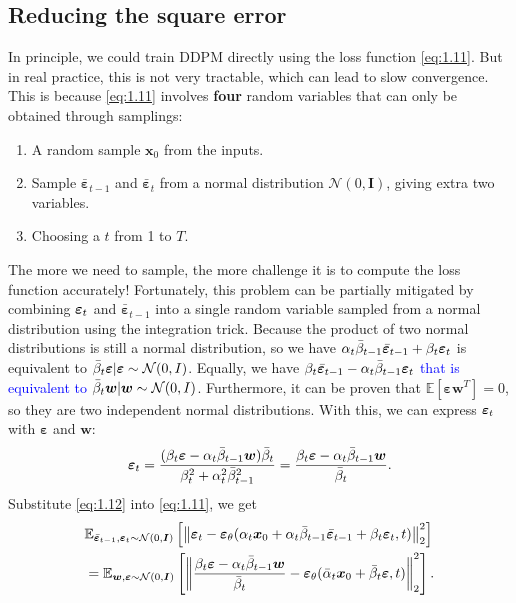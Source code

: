 \subsection{Reducing the square error}\label{sect1:reduce_error}
In principle, we could train DDPM directly using the loss function \cref{eq:1.11}. But in real practice, this is not very tractable, which can lead to slow convergence. This is because \cref{eq:1.11} involves \textbf{four} random variables that can only be obtained through samplings:
\begin{myquote}
\begin{enumerate}
    \item A random sample $\bm{x}_0$ from the inputs.
    \item Sample $\bar{\bm{\varepsilon}}_{t-1}$ and $\bar{\bm{\varepsilon}}_{t}$ from a normal distribution $\mathcal{N}(0,\bm{I})$, giving extra two variables.
    \item Choosing a $t$ from 1 to $T$.
\end{enumerate}
\end{myquote}
The more we need to sample, the more challenge it is to compute the loss function accurately! Fortunately, this problem can be partially mitigated by combining $\bm{\varepsilon}_t$ and $\bar{\bm{\varepsilon}}_{t-1}$ into a single random variable sampled from a normal distribution using the integration trick. Because the product of two normal distributions is still a normal distribution, so we have $\alpha_t\bar{\beta}_{t-1}\bar{\bm{\varepsilon}}_{t-1}+\beta_t\bm{\varepsilon}_t$ is equivalent to $\bar{\beta}_t\bm{\varepsilon}|\bm{\varepsilon}\sim\mathcal{N}(0,I)$. Equally, we have \textcolor{blue}{$\beta_t\bar{\bm{\varepsilon}}_{t-1}-\alpha_t\bar{\beta}_{t-1}\bm{\varepsilon}_t$ that is equivalent to $\bar{\beta}_t\bm{w}|\bm{w}\sim\mathcal{N}(0,I)$}.\marginnote{\footnotesize{\textcolor{blue}{Not quite sure where this comes from?}}} Furthermore, it can be proven that $\mathbb{E}[\bm{\varepsilon}\bm{w}^T]=0$, so they are two independent normal distributions. With this, we can express $\bm{\varepsilon}_t$ with $\bm{\varepsilon}$ and $\bm{w}$:
\begin{equation}
    \label{eq:1.12}
    \bm{\varepsilon}_t=\frac{(\beta_t\bm{\varepsilon}-\alpha_t\bar{\beta}_{t-1}\bm{w})\bar{\beta}_t}{\beta_t^2+\alpha_t^2\bar{\beta}_{t-1}^2}=\frac{\beta_t\bm{\varepsilon}-\alpha_t\bar{\beta}_{t-1}\bm{w}}{\bar{\beta}_t}.
\end{equation}
Substitute \cref{eq:1.12} into \cref{eq:1.11}, we get
\begin{align}
    &\mathbb{E}_{\bar{\bm{\varepsilon}}_{t-1},\bm{\varepsilon}_t\sim\mathcal{N}(0,\bm{I})}\left[\left\| \bm{\varepsilon}_t-\bm{\varepsilon}_\theta(\alpha_t\bm{x}_0+\alpha_t\bar{\beta}_{t-1}\bar{\bm{\varepsilon}}_{t-1}+\beta_t\bm{\varepsilon}_t,t) \right\|_2^2\right]\nonumber\\
    &=\mathbb{E}_{\bm{w},\bm{\varepsilon}\sim\mathcal{N}(0,\bm{I})}\left[\left\| \frac{\beta_t\bm{\varepsilon}-\alpha_t\bar{\beta}_{t-1}\bm{w}}{\bar{\beta}_t}-\bm{\varepsilon}_\theta (\bar{\alpha}_t\bm{x}_0+\bar{\beta}_t\bm{\varepsilon},t)   \right\|_2^2 \right]. \label{eq:1.13}
\end{align}
